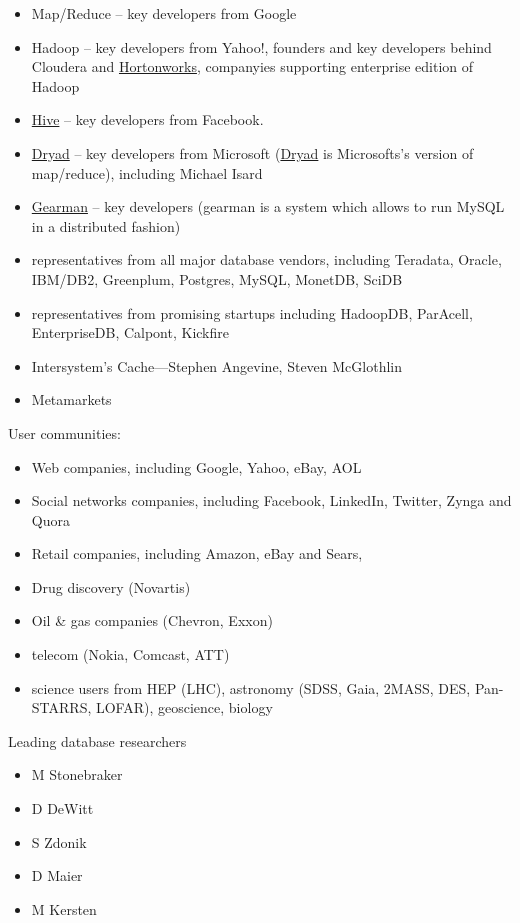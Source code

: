 \documentclass[DM,lsstdraft,toc]{lsstdoc}
\begin{document}
\begin{itemize}
\item
  Map/Reduce -- key developers from Google
\item
  Hadoop -- key developers from Yahoo!, founders and key developers
  behind Cloudera and \href{http://www.hortonworks.com/}{Hortonworks},
  companyies supporting enterprise edition of Hadoop
\item
  \href{http://wiki.apache.org/hadoop/Hive}{Hive} -- key developers from
  Facebook.
\item
  \href{http://research.microsoft.com/en-us/projects/dryad/}{Dryad} --
  key developers from Microsoft
  (\href{http://research.microsoft.com/en-us/projects/dryad/}{Dryad} is
  Microsofts's version of map/reduce), including Michael Isard
\item
  \href{http://gearman.org/}{Gearman} -- key developers (gearman is a
  system which allows to run MySQL in a distributed fashion)
\item
  representatives from all major database vendors, including Teradata,
  Oracle, IBM/DB2, Greenplum, Postgres, MySQL, MonetDB, SciDB
\item
  representatives from promising startups including HadoopDB, ParAcell,
  EnterpriseDB, Calpont, Kickfire
\item
  Intersystem's Cache---Stephen Angevine, Steven McGlothlin
\item
  Metamarkets
\end{itemize}

User communities:

\begin{itemize}
\item
  Web companies, including Google, Yahoo, eBay, AOL
\item
  Social networks companies, including Facebook, LinkedIn, Twitter,
  Zynga and Quora
\item
  Retail companies, including Amazon, eBay and Sears,
\item
  Drug discovery (Novartis)
\item
  Oil \& gas companies (Chevron, Exxon)
\item
  telecom (Nokia, Comcast, ATT)
\item
  science users from HEP (LHC), astronomy (SDSS, Gaia, 2MASS, DES,
  Pan-STARRS, LOFAR), geoscience, biology
\end{itemize}

Leading database researchers

\begin{itemize}
\item
  M Stonebraker
\item
  D DeWitt
\item
  S Zdonik
\item
  D Maier
\item
  M Kersten
\end{itemize}


\end{document}

